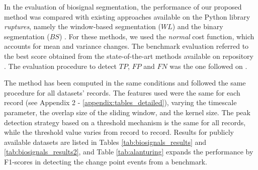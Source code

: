 In the evaluation of biosignal segmentation, the performance of our proposed method was compared with existing approaches available on the Python library \textit{ruptures}, namely the window-based segmentation ($WL$) and the binary segmentation ($BS$) \cite{review_2}. For these methods, we used the \textit{normal} cost function, which accounts for mean and variance changes. The benchmark evaluation referred to the best score obtained from the state-of-the-art methods available on repository  \cite{cpd_alan}. The evaluation procedure to detect $TP$, $FP$ and $FN$ was the one followed on \cite{cpd_alan}.

The method has been computed in the same conditions and followed the same procedure for all datasets' records. The features used were the same for each record (see Appendix 2 - \ref{appendix:tables_detailed}), varying the timescale parameter, the overlap size of the sliding window, and the kernel size. The peak detection strategy based on a threshold mechanism is the same for all records, while the threshold value varies from record to record. Results for publicly available datasets are listed in Tables \ref{tab:biosignals_results} and \ref{tab:biosignals_results2}, and Table \ref{tab:alanturing} expands the performance by F1-scores in detecting the change point events from a benchmark.


